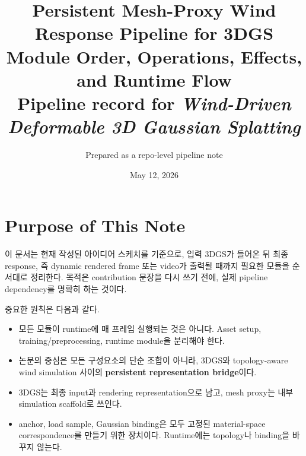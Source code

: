 \documentclass[11pt,a4paper]{article}
\title{\textbf{Persistent Mesh-Proxy Wind Response Pipeline for 3DGS}\\
\large Module Order, Operations, Effects, and Runtime Flow\\
\normalsize Pipeline record for \textit{Wind-Driven Deformable 3D Gaussian Splatting}}
\author{Prepared as a repo-level pipeline note}
\date{May 12, 2026}
\begin{document}
\maketitle

\begin{center}
\end{center}

\section{Purpose of This Note}

이 문서는 현재 작성된 아이디어 스케치를 기준으로, 입력 3DGS가 들어온 뒤 최종 response, 즉 dynamic rendered frame 또는 video가 출력될 때까지 필요한 모듈을 순서대로 정리한다. 목적은 contribution 문장을 다시 쓰기 전에, 실제 pipeline dependency를 명확히 하는 것이다.

중요한 원칙은 다음과 같다.

\begin{itemize}[leftmargin=1.4em]
    \item 모든 모듈이 runtime에 매 프레임 실행되는 것은 아니다. Asset setup, training/preprocessing, runtime module을 분리해야 한다.
    \item 논문의 중심은 모든 구성요소의 단순 조합이 아니라, 3DGS와 topology-aware wind simulation 사이의 \textbf{persistent representation bridge}이다.
    \item 3DGS는 최종 input과 rendering representation으로 남고, mesh proxy는 내부 simulation scaffold로 쓰인다.
    \item anchor, load sample, Gaussian binding은 모두 고정된 material-space correspondence를 만들기 위한 장치이다. Runtime에는 topology나 binding을 바꾸지 않는다.
\end{itemize}
\end{document}
